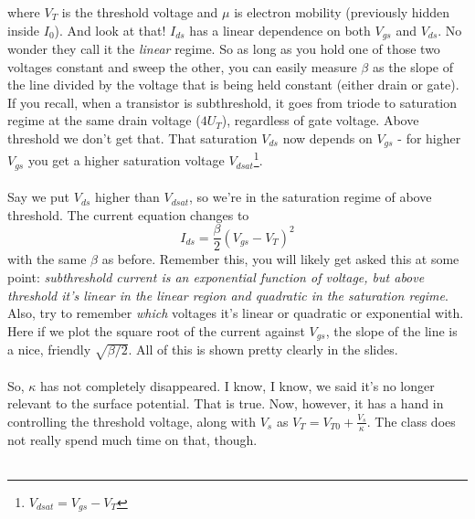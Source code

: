 where $V_T$ is the threshold voltage and $\mu$ is electron mobility (previously hidden inside $I_0$). And look at that! $I_{ds}$ has a linear dependence on both $V_{gs}$ and $V_{ds}$. No wonder they call it the \emph{linear} regime. So as long as you hold one of those two voltages constant and sweep the other, you can easily measure $\beta$ as the slope of the line divided by the voltage that is being held constant (either drain or gate). If you recall, when a transistor is subthreshold, it goes from triode to saturation regime at the same drain voltage ($4U_T$), regardless of gate voltage. Above threshold we don't get that. That saturation $V_{ds}$ now depends on $V_{gs}$ - for higher $V_{gs}$ you get a higher saturation voltage $V_{dsat}$\footnote{$V_{dsat} = V_{gs} - V_T$}.\\ \\
Say we put $V_{ds}$ higher than $V_{dsat}$, so we're in the saturation regime of above threshold. The current equation changes to
\begin{equation}
I_{ds} = \frac{\beta}{2}(V_{gs} - V_T)^2
\label{abvSatEqn}
\end{equation}
with the same $\beta$ as before. Remember this, you will likely get asked this at some point: \textsl{subthreshold current is an exponential function of voltage, but above threshold it's linear in the linear region and \emph{quadratic} in the saturation regime}. Also, try to remember \emph{which} voltages it's linear or quadratic or exponential with. Here if we plot the square root of the current against $V_{gs}$, the slope of the line is a nice, friendly $\sqrt{\beta/2}$. All of this is shown pretty clearly in the slides.\\ \\
So, $\kappa$ has not completely disappeared. I know, I know, we said it's no longer relevant to the surface potential. That is true. Now, however, it has a hand in controlling the threshold voltage, along with $V_s$ as $V_T = V_{T0} + \frac{V_s}{\kappa}$. The class does not really spend much time on that, though.\\ \\

